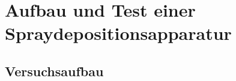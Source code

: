 \documentclass{beamer}
\begin{document}
% 






\section{Aufbau und Test einer Spraydepositionsapparatur}



\subsection[Versuchsaufbau]{Versuchsaufbau}
\end{document}

